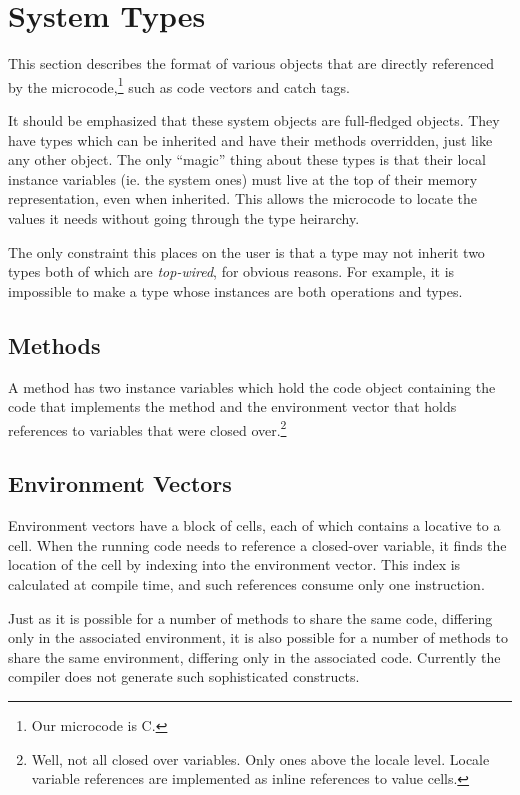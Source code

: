 \section{System Types}

This section describes the format of various objects that are directly
referenced by the microcode,\footnote{Our microcode is C.} such as
code vectors and catch tags.

It should be emphasized that these system objects are full-fledged objects.
They have types which can be inherited and have their methods overridden,
just like any other object.  The only ``magic'' thing about these types is
that their local instance variables (ie. the system ones) must live at the
top of their memory representation, even when inherited.  This allows the
microcode to locate the values it needs without going through the type
heirarchy.

The only constraint this places on the user is that a type may not inherit
two types both of which are {\em top-wired}, for obvious reasons.  For
example, it is impossible to make a type whose instances are both
operations and types.

\subsection{Methods}

A method has two instance variables which hold the code object
containing the code that implements the method and the environment
vector that holds references to variables that were closed
over.\footnote{Well, not all closed over variables.  Only ones above
the locale level.  Locale variable references are implemented as
inline references to value cells.}

\subsection{Environment Vectors}

Environment vectors have a block of cells, each of which contains a
locative to a cell.  When the running code needs to reference a
closed-over variable, it finds the location of the cell by indexing into
the environment vector.  This index is calculated at compile time, and such
references consume only one instruction.

Just as it is possible for a number of methods to share the same code,
differing only in the associated environment, it is also possible for
a number of methods to share the same environment, differing only in
the associated code.  Currently the compiler does not generate such
sophisticated constructs.

